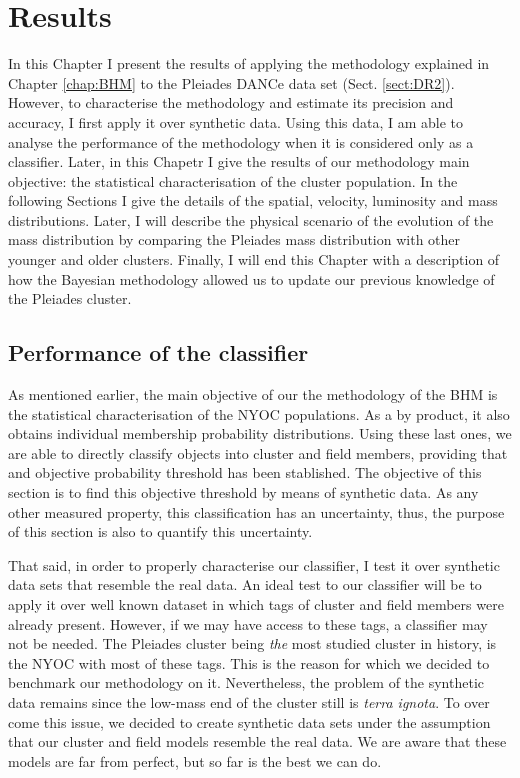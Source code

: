 \chapter{Results}
\label{chap:Results}
In this Chapter I present the results of applying the methodology explained in Chapter \ref{chap:BHM} to the Pleiades DANCe data set (Sect. \ref{sect:DR2}). However, to characterise the methodology and estimate its precision and accuracy, I first apply it over synthetic data. Using this data, I am able to analyse the performance of the methodology when it is considered only as a classifier. Later, in this Chapetr I give the results of our methodology main objective: the statistical characterisation of the cluster population. In the following Sections I give the details of the spatial, velocity, luminosity and mass distributions. Later, I will describe the physical scenario of the evolution of the mass distribution by comparing the Pleiades mass distribution with other younger and older clusters. Finally, I will end this Chapter with a description of how the Bayesian methodology allowed us to update our previous knowledge of the Pleiades cluster.

\section{Performance of the classifier}
\label{sect:classifier}
As mentioned earlier, the main objective of our the methodology of the BHM is the statistical characterisation of the NYOC populations. As a by product, it also obtains individual membership probability distributions. Using these last ones, we are able to directly classify objects into cluster and field members, providing that and objective probability threshold has been stablished. The objective of this section is to find this objective threshold by means of synthetic data. As any other measured property, this classification has an uncertainty, thus, the purpose of this section is also to quantify this uncertainty. 

That said, in order to properly characterise our classifier, I test it over synthetic data sets that resemble the real data. An ideal test to our classifier will be to apply it over well known dataset in which tags of cluster and field members were already present. However, if we may have access to these tags, a classifier may not be needed. The Pleiades cluster being \emph{the} most studied cluster in history, is the  NYOC with most of these tags. This is the reason for which we decided to benchmark our methodology on it. Nevertheless, the problem of the synthetic data remains since the low-mass end of the cluster still is \emph{terra ignota}. To over come this issue, we decided to create synthetic data sets under the assumption that our cluster and field models resemble the real data.  We are aware that these models are far from perfect, but so far is the best we can do. 

